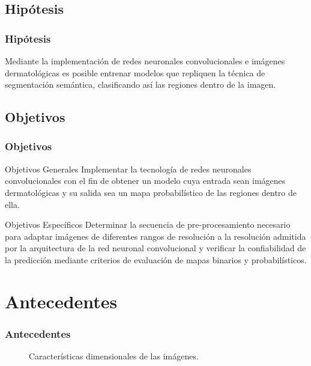 \documentclass{beamer}
\begin{document}
\subsection{Hipótesis}
\begin{frame}
    \frametitle{Hipótesis}
    Mediante la implementación de redes neuronales convolucionales e imágenes dermatológicas es posible entrenar modelos que repliquen la técnica de segmentación semántica, clasificando así las regiones dentro de la imagen. 
\end{frame}

\subsection{Objetivos}
\begin{frame}
    \frametitle{Objetivos}
    \begin{block}{Objetivos Generales}
        Implementar la tecnología de redes neuronales convolucionales con el fin de obtener un modelo cuya entrada sean imágenes dermatológicas y su salida sea un mapa probabilístico de las regiones dentro de ella.
        
    \end{block}
    \begin{block}{Objetivos Específicos}
        Determinar la secuencia de pre-procesamiento necesario para adaptar imágenes de diferentes rangos de resolución a la resolución admitida por la arquitectura de la red neuronal convolucional y verificar la confiabilidad de la predicción mediante criterios de evaluación de mapas binarios y probabilísticos.
        
    \end{block}
\end{frame}

\section{Antecedentes}


\begin{frame}
\frametitle{Antecedentes}
    \begin{figure}
        \centering
         \qquad
        \caption{Características dimensionales de las imágenes.}
    \end{figure}
\end{frame}
\end{document}
